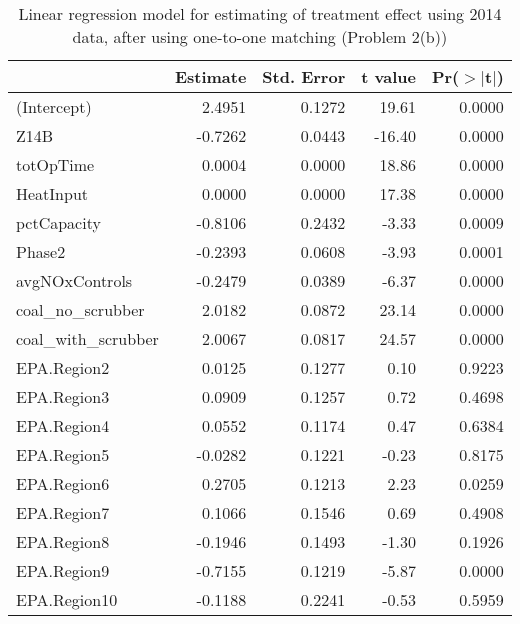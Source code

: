 \begin{table}[ht]
\centering
\begin{tabular}{lrrrr}
  \toprule
 & Estimate & Std. Error & t value & Pr($>$$|$t$|$) \\ 
  \midrule
(Intercept) & 2.4951 & 0.1272 & 19.61 & 0.0000 \\ 
  Z14B & -0.7262 & 0.0443 & -16.40 & 0.0000 \\ 
  totOpTime & 0.0004 & 0.0000 & 18.86 & 0.0000 \\ 
  HeatInput & 0.0000 & 0.0000 & 17.38 & 0.0000 \\ 
  pctCapacity & -0.8106 & 0.2432 & -3.33 & 0.0009 \\ 
  Phase2 & -0.2393 & 0.0608 & -3.93 & 0.0001 \\ 
  avgNOxControls & -0.2479 & 0.0389 & -6.37 & 0.0000 \\ 
  coal\_no\_scrubber & 2.0182 & 0.0872 & 23.14 & 0.0000 \\ 
  coal\_with\_scrubber & 2.0067 & 0.0817 & 24.57 & 0.0000 \\ 
  EPA.Region2 & 0.0125 & 0.1277 & 0.10 & 0.9223 \\ 
  EPA.Region3 & 0.0909 & 0.1257 & 0.72 & 0.4698 \\ 
  EPA.Region4 & 0.0552 & 0.1174 & 0.47 & 0.6384 \\ 
  EPA.Region5 & -0.0282 & 0.1221 & -0.23 & 0.8175 \\ 
  EPA.Region6 & 0.2705 & 0.1213 & 2.23 & 0.0259 \\ 
  EPA.Region7 & 0.1066 & 0.1546 & 0.69 & 0.4908 \\ 
  EPA.Region8 & -0.1946 & 0.1493 & -1.30 & 0.1926 \\ 
  EPA.Region9 & -0.7155 & 0.1219 & -5.87 & 0.0000 \\ 
  EPA.Region10 & -0.1188 & 0.2241 & -0.53 & 0.5959 \\ 
   \bottomrule
\end{tabular}
\caption{Linear regression model for estimating of treatment effect using 2014 data, after using one-to-one matching (Problem 2(b))} 
\label{tab:lm-2b-14}
\end{table}


